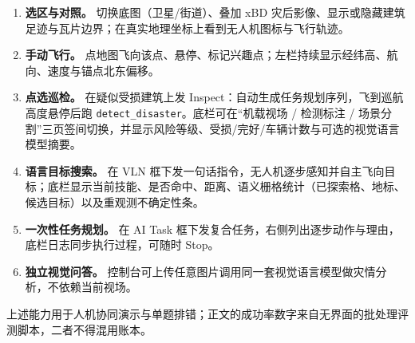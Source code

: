 \begin{enumerate}
\item \textbf{选区与对照。} 切换底图（卫星/街道）、叠加 xBD 灾后影像、显示或隐藏建筑足迹与瓦片边界；在真实地理坐标上看到无人机图标与飞行轨迹。
\item \textbf{手动飞行。} 点地图飞向该点、悬停、标记兴趣点；左栏持续显示经纬高、航向、速度与锚点北东偏移。
\item \textbf{点选巡检。} 在疑似受损建筑上发 Inspect：自动生成任务规划序列，飞到巡航高度悬停后跑 \texttt{detect\_disaster}。底栏可在``机载视场 / 检测标注 / 场景分割''三页签间切换，并显示风险等级、受损/完好/车辆计数与可选的视觉语言模型摘要。
\item \textbf{语言目标搜索。} 在 VLN 框下发一句话指令，无人机逐步感知并自主飞向目标；底栏显示当前技能、是否命中、距离、语义栅格统计（已探索格、地标、候选目标）以及重观测不确定性条。
\item \textbf{一次性任务规划。} 在 AI Task 框下发复合任务，右侧列出逐步动作与理由，底栏日志同步执行过程，可随时 Stop。
\item \textbf{独立视觉问答。} 控制台可上传任意图片调用同一套视觉语言模型做灾情分析，不依赖当前视场。
\end{enumerate}

上述能力用于人机协同演示与单题排错；正文的成功率数字来自无界面的批处理评测脚本，二者不得混用账本。

